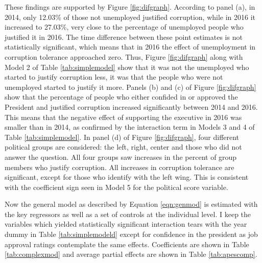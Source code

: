 \documentclass[12pt,a4]{article}\usepackage[]{graphicx}\usepackage[]{xcolor}
\begin{document}
These findings are supported by Figure \ref{fig:difgraph}. According to panel (a), in 2014, only 12.03\% of those not unemployed justified corruption, while in 2016 it increased to 27.03\%, very close to the percentage of unemployed people who justified it in 2016. The time difference between these point estimates is not statistically significant, which means that in 2016 the effect of unemployment in corruption tolerance approached zero. Thus, Figure \ref{fig:difgraph} along with Model 2 of Table \ref{tab:simplemodel} show that it was not the unemployed who started to justify corruption less, it was that the people who were not unemployed started to justify it more. Panels (b) and (c) of Figure \ref{fig:difgraph} show that the percentage of people who either confided in or approved the President and justified corruption increased significantly  between 2014 and 2016. This means that the negative effect of supporting the executive in 2016 was smaller than in 2014, as confirmed by the interaction term in Models 3 and 4 of Table \ref{tab:simplemodel}. In panel (d) of Figure \ref{fig:difgraph}, four different political groups are considered: the left, right, center and those who did not answer the question. All four groups saw increases in the percent of group members who justify corruption. All increases in corruption tolerance are significant, except for those who identify with the left wing. This is consistent with the coefficient sign seen in Model 5 for the political score variable. 






Now the general model as described by Equation \ref{eqn:genmod} is estimated with the key regressors as well as a set of controls at the individual level. I keep the variables which yielded statistically significant interaction tears with the year dummy in Table \ref{tab:simplemodeld} except for confidence in the president as job approval ratings contemplate the same effects. Coefficients are shown in Table \ref{tab:complexmod} and average partial effects are shown in Table \ref{tab:apescomp}. 

\end{document}
